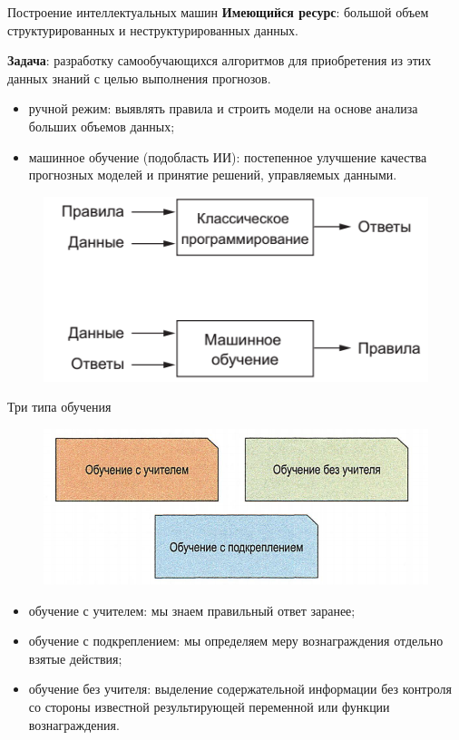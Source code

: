 \documentclass{beamer}
\begin{document}
\begin{frame}[t]{Построение интеллектуальных машин}
\textbf{Имеющийся ресурс}: большой объем структурированных и неструктурированных данных.

\textbf{Задача}: разработку самообучающихся алгоритмов для приобретения из этих данных знаний с целью выполнения прогнозов.
\begin{itemize}
\item ручной режим: выявлять правила и строить модели на основе анализа
больших объемов данных;
\item машинное обучение (подобласть ИИ):  постепенное улучшение качества прогнозных моделей и принятие решений, управляемых данными.
\end{itemize}
\begin{figure}[h]
\centering
\includegraphics[scale=0.4]{images/lec01-pic12.png}
\end{figure}
\end{frame}

\begin{frame}[t]{Три типа обучения}
\begin{figure}[h]
\centering
\includegraphics[scale=0.3]{images/lec01-pic03.png}
\end{figure}
\begin{itemize}
\item обучение с учителем: мы знаем правильный ответ заранее; 
\item обучение с подкреплением: мы определяем меру вознаграждения отдельно взятые действия;
\item обучение без учителя: выделение содержательной информации без контроля со стороны известной результирующей переменной или функции вознаграждения.
\end{itemize}
\end{frame}
\end{document}
